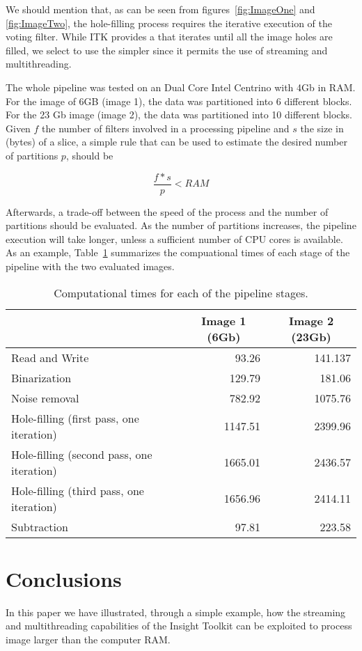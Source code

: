 \documentclass{InsightArticle}
\begin{document}
We should mention that, as can be seen from figures~\ref{fig:ImageOne} and
\ref{fig:ImageTwo}, the hole-filling process requires the iterative execution of
the voting filter. While ITK provides a 
that iterates until all the image holes are filled, we select to use the simpler
 since it permits the use of streaming
and multithreading.

The whole pipeline was tested on an Dual Core Intel Centrino with 4Gb in RAM. For the image of 6GB (image 1),
the data was partitioned into 6 different blocks. For the 23 Gb image (image 2), the data was partitioned into
10 different blocks. Given $f$ the number of filters involved
in a processing pipeline and $s$ the size in (bytes) of a slice, a simple rule that can be
used to estimate the desired number of partitions $p$,  should be

\begin{equation}
  \frac{f*s}{p} < RAM
\end{equation}

Afterwards, a trade-off between the speed of the process and the number of partitions
should be evaluated. As the number of partitions increases, the pipeline execution will
take longer, unless a sufficient number of CPU cores is available. As an example,
Table~\ref{table:times} summarizes the compuational times of each stage of the pipeline
with the two evaluated images.

\begin{table}
\caption{Computational times for each of the pipeline stages.}
\begin{center}
 \begin{tabular}{l|rr}
 \hline
 & \multicolumn{1}{c}{\textbf{Image 1 (6Gb)}} & \multicolumn{1}{c}{\textbf{Image 2 (23Gb)}}\\
 \hline
Read and Write & 93.26 & 141.137\\
Binarization & 129.79 & 181.06 \\
Noise removal & 782.92 & 1075.76 \\
Hole-filling (first pass, one iteration) & 1147.51 & 2399.96 \\
Hole-filling (second pass, one iteration) & 1665.01 & 2436.57\\
Hole-filling (third pass, one iteration) & 1656.96 & 2414.11\\
Subtraction & 97.81 & 223.58\\
 \hline
\end{tabular}
\end{center}
\label{table:times}
\end{table}

\section{Conclusions}
In this paper we have illustrated, through a simple example, how the streaming
and multithreading capabilities of the Insight Toolkit can be exploited to
process image larger than the computer RAM.



\end{document}
